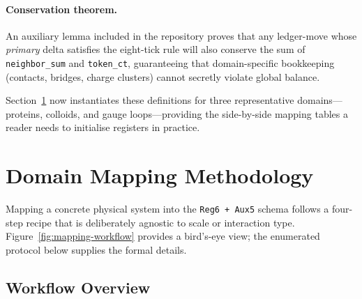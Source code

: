 \documentclass[11pt,a4paper]{article}
\begin{document}
\paragraph{Conservation theorem.}
An auxiliary lemma included in the repository proves that any
ledger-move whose \emph{primary} delta satisfies the eight-tick rule
will also conserve the sum of \texttt{neighbor\_sum} and
\texttt{token\_ct}, guaranteeing that domain-specific bookkeeping
(contacts, bridges, charge clusters) cannot secretly violate global
balance.

\bigskip
Section~\ref{sec:mappings} now instantiates these definitions for three
representative domains—proteins, colloids, and gauge loops—providing the
side-by-side mapping tables a reader needs to initialise registers in
practice.

\section{Domain Mapping Methodology}
\label{sec:mappings}

\noindent
Mapping a concrete physical system into the \texttt{Reg6\,+\,Aux5} schema
follows a four-step recipe that is deliberately agnostic to scale or
interaction type.  Figure~\ref{fig:mapping-workflow} provides a
bird’s-eye view; the enumerated protocol below supplies the formal
details.

\subsection{Workflow Overview}
\label{subsec:mapping-workflow}
\end{document}
